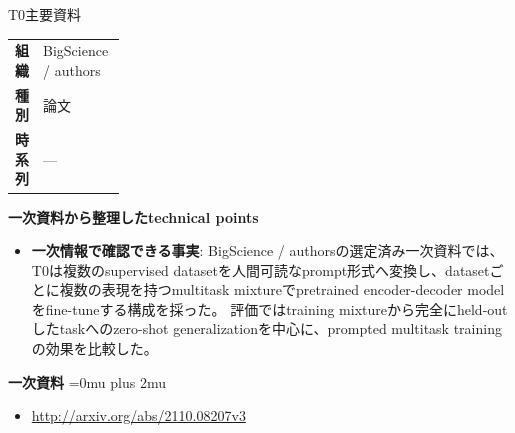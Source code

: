 \begin{technicalnote}{T0}{主要資料}
\begingroup
\begin{tabularx}{\linewidth}{@{}>{\bfseries}p{0.22\linewidth}X@{}}
組織 & BigScience / authors \\
種別 & 論文 \\
時系列 & — \\
\end{tabularx}
\smallskip
{\bfseries 一次資料から整理したtechnical points}
\begin{itemize}[leftmargin=1.5em,itemsep=0.35em]
\item \textbf{一次情報で確認できる事実}: BigScience / authorsの選定済み一次資料では、T0は複数のsupervised datasetを人間可読なprompt形式へ変換し、datasetごとに複数の表現を持つmultitask mixtureでpretrained encoder-decoder modelをfine-tuneする構成を採った。 評価ではtraining mixtureから完全にheld-outしたtaskへのzero-shot generalizationを中心に、prompted multitask trainingの効果を比較した。
\end{itemize}
\begin{minipage}{\linewidth}
\begin{samepage}
{\bfseries 一次資料}
\begingroup\sloppy
\Urlmuskip=0mu plus 2mu\relax
\begin{itemize}[leftmargin=1.5em,itemsep=0.25em]
\item {\scriptsize\url{http://arxiv.org/abs/2110.08207v3}}
\end{itemize}
\endgroup
\end{samepage}
\end{minipage}
\endgroup
\end{technicalnote}
\medskip

